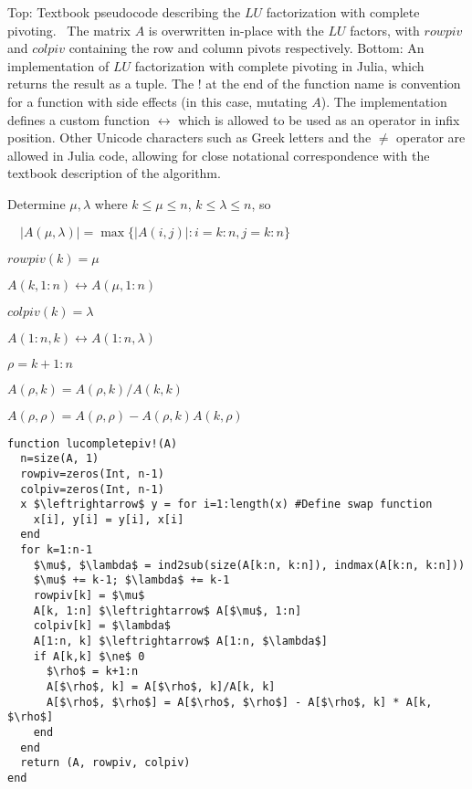 \begin{algorithm}

\caption{Top: Textbook pseudocode describing the $LU$ factorization with
complete pivoting.~\cite[Algorithm 3.4.3 (Outer Product LU with Complete
Pivoting), p. 132]{Golub2013} The matrix $A$ is overwritten in-place with the
$LU$ factors, with $rowpiv$ and $colpiv$ containing the row and column pivots
respectively.
Bottom: An implementation of $LU$ factorization with complete pivoting in Julia,
which returns the result as a tuple. The ! at the end of the function name is
convention for a function with side effects (in this case, mutating $A$). The
implementation defines a custom function $\leftrightarrow$ which is allowed to
be used as an operator in infix position. Other Unicode characters such as
Greek letters and the $\ne$ operator are allowed in Julia code, allowing for
close notational correspondence with the textbook description of the algorithm.}
\label{alg:lucompletepiv}

\begin{algorithmic}

    Determine $\mu, \lambda$ where $k \le \mu \le n$,  $k \le \lambda \le n$, so

    $\quad\left|A(\mu, \lambda)\right| = \max\{ \left|A(i, j)\right| : i=k:n, j=k:n \}$

    $rowpiv(k) = \mu$

    $A(k, 1:n) \leftrightarrow A(\mu, 1:n)$

    $colpiv(k) = \lambda$

    $A(1:n, k) \leftrightarrow A(1:n, \lambda)$


        $\rho = k+1:n$

        $A(\rho, k) = A(\rho, k)/A(k, k)$

        $A(\rho, \rho) = A(\rho, \rho) - A(\rho, k) A(k, \rho)$
    \EndIf
\EndFor
\end{algorithmic}

\hrulefill

\begin{lstlisting}
function lucompletepiv!(A)
  n=size(A, 1)
  rowpiv=zeros(Int, n-1)
  colpiv=zeros(Int, n-1)
  x $\leftrightarrow$ y = for i=1:length(x) #Define swap function
    x[i], y[i] = y[i], x[i]
  end
  for k=1:n-1
    $\mu$, $\lambda$ = ind2sub(size(A[k:n, k:n]), indmax(A[k:n, k:n]))
    $\mu$ += k-1; $\lambda$ += k-1
    rowpiv[k] = $\mu$
    A[k, 1:n] $\leftrightarrow$ A[$\mu$, 1:n]
    colpiv[k] = $\lambda$
    A[1:n, k] $\leftrightarrow$ A[1:n, $\lambda$]
    if A[k,k] $\ne$ 0
      $\rho$ = k+1:n
      A[$\rho$, k] = A[$\rho$, k]/A[k, k]
      A[$\rho$, $\rho$] = A[$\rho$, $\rho$] - A[$\rho$, k] * A[k, $\rho$]
    end
  end
  return (A, rowpiv, colpiv)
end
\end{lstlisting}

\end{algorithm}


